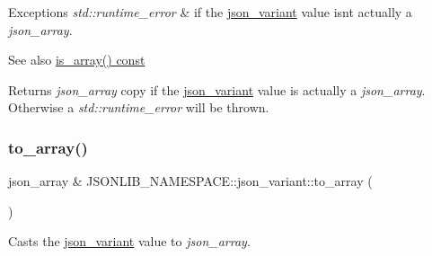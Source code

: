 \begin{DoxyExceptions}{Exceptions}
{\em std\+::runtime\+\_\+error} & if the \hyperlink{classJSONLIB__NAMESPACE_1_1json__variant}{json\+\_\+variant} value isn\textquotesingle{}t actually a {\itshape json\+\_\+array}. \\
\hline
\end{DoxyExceptions}
\begin{DoxySeeAlso}{See also}
\hyperlink{classJSONLIB__NAMESPACE_1_1json__variant_a72349dff71a411ac24eea6d943772df7}{is\+\_\+array() const} 
\end{DoxySeeAlso}
\begin{DoxyReturn}{Returns}
{\itshape json\+\_\+array} copy if the \hyperlink{classJSONLIB__NAMESPACE_1_1json__variant}{json\+\_\+variant} value is actually a {\itshape json\+\_\+array}. Otherwise a {\itshape std\+::runtime\+\_\+error} will be thrown. 
\end{DoxyReturn}
\mbox{\label{classJSONLIB__NAMESPACE_1_1json__variant_a2af42a0f5c2fb4a8a74d2cae1166752a}} 
\subsubsection{\texorpdfstring{to\+\_\+array()}{to\_array()}\hspace{0.1cm}{\footnotesize\ttfamily [2/2]}}
{\footnotesize\ttfamily json\+\_\+array \& J\+S\+O\+N\+L\+I\+B\+\_\+\+N\+A\+M\+E\+S\+P\+A\+C\+E\+::json\+\_\+variant\+::to\+\_\+array (\begin{DoxyParamCaption}{ }\end{DoxyParamCaption})}



Casts the \hyperlink{classJSONLIB__NAMESPACE_1_1json__variant}{json\+\_\+variant} value to {\itshape json\+\_\+array}. 


